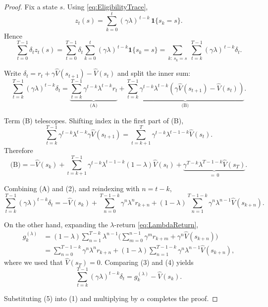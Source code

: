 \documentclass[
]{book}
\theoremstyle{definition}
\theoremstyle{definition}
\theoremstyle{definition}
\theoremstyle{definition}
\theoremstyle{remark}
\begin{document}
\begin{proof}
Fix a state \(s\). Using \eqref{eq:EligibilityTrace},
\[
z_t(s)=\sum_{k=0}^{t}(\gamma\lambda)^{\,t-k}\,\mathbf{1}\{s_k=s\}.
\]
Hence
\[
\sum_{t=0}^{T-1}\delta_t z_t(s)
=\sum_{t=0}^{T-1}\delta_t \sum_{k=0}^{t}(\gamma\lambda)^{\,t-k}\mathbf{1}\{s_k=s\}
=\sum_{k:\,s_k=s}\; \sum_{t=k}^{T-1} (\gamma\lambda)^{\,t-k}\delta_t .
\tag{1}
\]

Write \(\delta_t=r_t+\gamma\hat V(s_{t+1})-\hat V(s_t)\) and split the inner sum:
\[
\sum_{t=k}^{T-1} (\gamma\lambda)^{t-k}\delta_t
= \underbrace{\sum_{t=k}^{T-1} \gamma^{t-k}\lambda^{t-k} r_t}_{\text{(A)}}
+ \underbrace{\sum_{t=k}^{T-1}\gamma^{t-k}\lambda^{t-k}(\gamma\hat V(s_{t+1})-\hat V(s_t))}_{\text{(B)}}.
\]

Term (B) telescopes. Shifting index in the first part of (B),
\[
\sum_{t=k}^{T-1}\gamma^{t-k}\lambda^{t-k}\gamma \hat V(s_{t+1})
= \sum_{t=k+1}^{T}\gamma^{t-k}\lambda^{t-1-k}\hat V(s_t).
\]
Therefore
\[
\text{(B)}=
-\hat V(s_k) 
+ \sum_{t=k+1}^{T-1}\gamma^{t-k}\lambda^{t-1-k}(1-\lambda)\hat V(s_t)
+ \underbrace{\gamma^{T-k}\lambda^{T-1-k}\hat V(s_T)}_{=\,0}.
\tag{2}
\]

Combining (A) and (2), and reindexing with \(n=t-k\),
\[
\sum_{t=k}^{T-1} (\gamma\lambda)^{t-k}\delta_t
= -\hat V(s_k)
+ \sum_{n=0}^{T-1-k}\gamma^{n}\lambda^{n} r_{k+n}
+ (1-\lambda)\sum_{n=1}^{T-1-k}\gamma^{n}\lambda^{n-1}\hat V(s_{k+n}).
\tag{3}
\]

On the other hand, expanding the \(\lambda\)-return \eqref{eq:LambdaReturn},
\[
\begin{aligned}
g_k^{(\lambda)}
&=(1-\lambda)\sum_{n=1}^{T-k}\lambda^{n-1}
\Bigg(\sum_{m=0}^{n-1}\gamma^{m} r_{k+m} + \gamma^{n}\hat V(s_{k+n})\Bigg)\\
&= \sum_{n=0}^{T-1-k}\gamma^{n}\lambda^{n} r_{k+n}
+ (1-\lambda)\sum_{n=1}^{T-1-k}\gamma^{n}\lambda^{n-1}\hat V(s_{k+n}),
\end{aligned}
\tag{4}
\]
where we used that \(\hat V(s_T)=0\). Comparing (3) and (4) yields
\[
\sum_{t=k}^{T-1} (\gamma\lambda)^{t-k}\delta_t
= g_k^{(\lambda)} - \hat V(s_k).
\tag{5}
\]

Substituting (5) into (1) and multiplying by \(\alpha\) completes the proof.
\end{proof}
\end{document}
